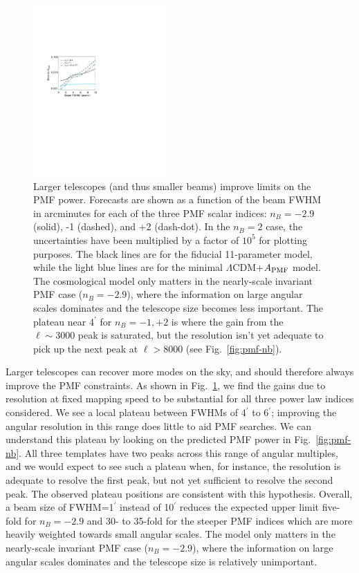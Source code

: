 \documentclass[apj]{emulateapj}
\newcommand{\apmf}{\ensuremath{A_{\rm PMF}}}
\newcommand{\lcdm}{\ensuremath{\Lambda}CDM}
\begin{document}
\begin{figure}[htb]\centering
\includegraphics[width=0.45\textwidth,clip,trim={2.cm 12.5cm 11cm 7.5cm}]{pmf_beam.pdf}
  \caption[]{ \label{fig:beam}
 Larger telescopes (and thus smaller beams) improve limits on the PMF power. 
 Forecasts are shown as a function of the beam FWHM in arcminutes for each of the three PMF scalar indices: $n_B = -2.9$ (solid), -1 (dashed), and +2 (dash-dot). 
   In the $n_B=2$ case, the uncertainties have been multiplied by a factor of $10^5$ for plotting purposes. 
  The black lines are for the fiducial 11-parameter model, while the light blue lines are for the minimal \lcdm{}+\apmf{} model. 
  The cosmological model only matters in the nearly-scale invariant PMF case ($n_B=-2.9$), where the information on large angular scales dominates and the telescope size becomes less important. 
  The plateau near 4$^\prime$ for $n_B=-1, +2$ is where the gain from the $\ell\sim3000$ peak is saturated, but the resolution isn't yet adequate to pick up the next peak at $\ell > 8000$ (see  Fig.~\ref{fig:pmf-nb}).  
    }
\end{figure}

Larger telescopes can recover more modes on the sky, and should therefore always improve the PMF constraints. 
As shown in Fig.~\ref{fig:beam}, we find the gains due to resolution at fixed mapping speed to be substantial for all three power law indices considered. 
We see a local plateau between FWHMs of 4$^\prime$ to 6$^\prime$; improving the angular resolution in this range does little to aid PMF searches. 
We can understand this plateau by looking on the predicted PMF power in Fig.~\ref{fig:pmf-nb}. 
All three templates have two peaks across this range of angular multiples, and we would expect to see such a plateau when, for instance, the resolution is adequate to resolve the first peak, but not yet sufficient to resolve the second peak. 
The observed plateau positions are consistent with this hypothesis. 
 Overall, a beam size of FWHM=1$^\prime$ instead of 10$^\prime$ reduces the expected upper limit five-fold for $n_B=-2.9$ and 30- to 35-fold for the steeper PMF indices which are more heavily weighted towards small angular scales. 
   The model only matters in the nearly-scale invariant PMF case ($n_B=-2.9$), where the information on large angular scales dominates and the telescope size is relatively unimportant. 
\end{document}
